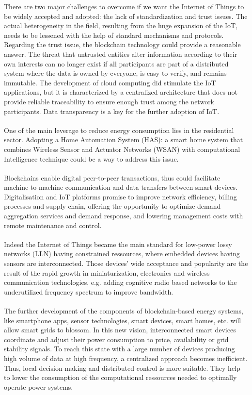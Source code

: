 \documentclass[11pt]{article}
\begin{document}
There are two major challenges to overcome if we want the Internet of Things to be widely accepted and adopted: the lack of standardization and trust issues. The actual heterogeneity in the field, resulting from the huge expansion of the IoT, needs to be lessened with the help of standard mechanisms and protocols. Regarding the trust issue, the blockchain technology could provide a reasonable answer. The threat that untrusted entities alter information according to their own interests can no longer exist if all participants are part of a distributed system where the data is owned by everyone, is easy to verify, and remains immutable. The development of cloud computing did stimulate the IoT applications, but it is characterized by a centralized architecture that does not provide reliable traceability to ensure enough trust among the network participants. Data transparency is a key for the further adoption of IoT.\cite{8}\\\\
One of the main leverage to reduce energy consumption lies in the residential sector. Adopting a Home Automation System (HAS): a smart home system that combines Wireless Sensor and Actuator Networks (WSAN) with computational Intelligence technique could be a way to address this issue.\cite{9}\\\\
Blockchains enable digital peer-to-peer transactions, thus could facilitate machine-to-machine communication and data transfers between smart devices. Digitalisation and IoT platforms promise to improve network efficiency, billing processes and supply chain, offering the opportunity to optimize demand aggregation services and demand response, and lowering management costs with remote maintenance and control.\cite{10}\\\\
Indeed the Internet of Things became the main standard for low-power lossy networks (LLN) having constrained ressources, where embedded devices having sensors are interconnected. Those devices' wide acceptance and popularity are the result of the rapid growth in miniaturization, electronics and wireless communication technologies, e.g. adding cognitive radio based networks to the underutilized frequency spectrum to improve bandwidth.\cite{11}\\\\
The further development of the components of blockchain-based energy systems, like smartphone apps, sensor technologies, smart devices, smart homes, etc. will allow smart grids to blossom. In this new vision, interconnected smart devices coordinate and adjust their power consumption to price, availability or grid stability signals. To reach this state with a large number of devices producing high volume of data at high frequency, a centralized approach becomes inefficient. Thus, local decision-making and distributed control is more suitable. They help to lower the consumption of the computational ressources needed to optimally operate power systems.\cite{10}\\
\end{document}
